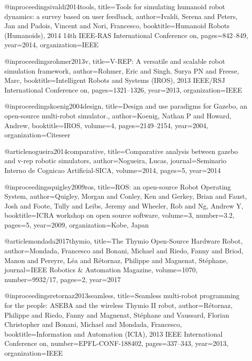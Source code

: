@inproceedings{ivaldi2014tools,
  title={Tools for simulating humanoid robot dynamics: a survey based on user feedback},
  author={Ivaldi, Serena and Peters, Jan and Padois, Vincent and Nori, Francesco},
  booktitle={Humanoid Robots (Humanoids), 2014 14th IEEE-RAS International Conference on},
  pages={842--849},
  year={2014},
  organization={IEEE}
}

@inproceedings{rohmer2013v,
  title={V-REP: A versatile and scalable robot simulation framework},
  author={Rohmer, Eric and Singh, Surya PN and Freese, Marc},
  booktitle={Intelligent Robots and Systems (IROS), 2013 IEEE/RSJ International Conference on},
  pages={1321--1326},
  year={2013},
  organization={IEEE}
}

@inproceedings{koenig2004design,
  title={Design and use paradigms for Gazebo, an open-source multi-robot simulator.},
  author={Koenig, Nathan P and Howard, Andrew},
  booktitle={IROS},
  volume={4},
  pages={2149--2154},
  year={2004},
  organization={Citeseer}
}

@article{nogueira2014comparative,
  title={Comparative analysis between gazebo and v-rep robotic simulators},
  author={Nogueira, Lucas},
  journal={Seminario Interno de Cognicao Artificial-SICA},
  volume={2014},
  pages={5},
  year={2014}
}

@inproceedings{quigley2009ros,
  title={ROS: an open-source Robot Operating System},
  author={Quigley, Morgan and Conley, Ken and Gerkey, Brian and Faust, Josh and Foote, Tully and Leibs, Jeremy and Wheeler, Rob and Ng, Andrew Y},
  booktitle={ICRA workshop on open source software},
  volume={3},
  number={3.2},
  pages={5},
  year={2009},
  organization={Kobe, Japan}
}

@article{mondada2017thymio,
  title={The Thymio Open-Source Hardware Robot},
  author={Mondada, Francesco and Bonani, Michael and Riedo, Fanny and Briod, Manon and Pereyre, L{\'e}a and R{\'e}tornaz, Philippe and Magnenat, St{\'e}phane},
  journal={IEEE Robotics \& Automation Magazine},
  volume={1070},
  number={9932/17},
  pages={2},
  year={2017}
}

@inproceedings{retornaz2013seamless,
  title={Seamless multi-robot programming for the people: ASEBA and the wireless Thymio II robot},
  author={R{\'e}tornaz, Philippe and Riedo, Fanny and Magnenat, St{\'e}phane and Vaussard, Florian Christopher and Bonani, Michael and Mondada, Francesco},
  booktitle={Information and Automation (ICIA), 2013 IEEE International Conference on},
  number={EPFL-CONF-188402},
  pages={337--343},
  year={2013},
  organization={IEEE}
}

